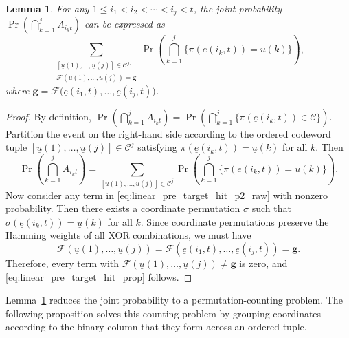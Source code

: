 \documentclass[letterpaper,draftclsnofoot,onecolumn]{IEEEtran}
\newtheorem{lemma}{Lemma}
\begin{document}
\begin{lemma}\label{lem:linear_pre_target_hit}
For any $1\le i_1<i_2<\cdots<i_j<t$, the joint probability 
$\Pr\!\left(\bigcap_{k=1}^{j}A_{i_k t}\right)$ can be expressed as
\begin{equation}
\sum_{\substack{
[\underline{u}(1),\ldots,\underline{u}(j)] \in \mathcal{C}^{j}:\\
\mathcal{F}(\underline{u}(1),\ldots,\underline{u}(j)) = \mathbf{g}
}}
\Pr\!\left(
\bigcap_{k=1}^{j}\{\pi(\underline{e}(i_k,t))=\underline{u}(k)\}
\right),
\label{eq:linear_pre_target_hit_prop}
\end{equation}
where $\mathbf{g} = \mathcal{F}\big(\underline{e}(i_1,t),\ldots,\underline{e}(i_j,t)\big)$.
\end{lemma}

\begin{proof}
By definition, $\Pr\!\left(\bigcap_{k=1}^{j}A_{i_k t}\right)=\Pr\!\left(\bigcap_{k=1}^{j}\{\pi(\underline{e}(i_k,t))\in\mathcal{C}\}\right).$ Partition the event on the right-hand side according to the ordered codeword tuple $[\underline{u}(1),\ldots,\underline{u}(j)]\in\mathcal{C}^j$ satisfying $\pi(\underline{e}(i_k,t))=\underline{u}(k)$ for all $k$. Then
\begin{equation}
\Pr\!\left(\bigcap_{k=1}^{j}A_{i_k t}\right)
=
\sum_{[\underline{u}(1),\ldots,\underline{u}(j)]\in\mathcal{C}^j}
\Pr\!\left(\bigcap_{k=1}^{j}\{\pi(\underline{e}(i_k,t))=\underline{u}(k)\}\right).
\label{eq:linear_pre_target_hit_p2_raw}
\end{equation}
Now consider any term in \eqref{eq:linear_pre_target_hit_p2_raw} with nonzero probability. Then there exists a coordinate permutation $\sigma$ such that $\sigma(\underline{e}(i_k,t))=\underline{u}(k)$ for all $k$. Since coordinate permutations preserve the Hamming weights of all XOR combinations, we must have
\begin{equation}
\mathcal{F}(\underline{u}(1),\ldots,\underline{u}(j))
=
\mathcal{F}(\underline{e}(i_1,t),\ldots,\underline{e}(i_j,t))
=
\mathbf{g}.
\end{equation}
Therefore, every term with $\mathcal{F}(\underline{u}(1),\ldots,\underline{u}(j))\neq \mathbf{g}$ is zero, and \eqref{eq:linear_pre_target_hit_prop} follows.
\end{proof}


Lemma~\ref{lem:linear_pre_target_hit} reduces the joint probability to a permutation-counting problem. The following proposition solves this counting problem by grouping coordinates according to the binary column that they form across an ordered tuple.
\end{document}
